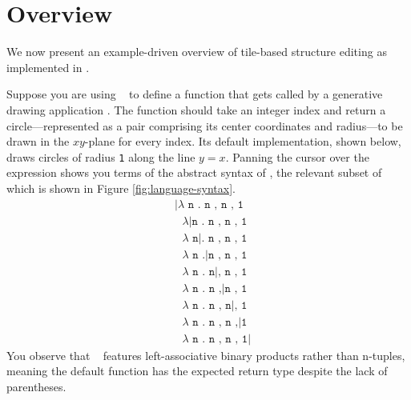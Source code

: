 \section{Overview}\label{sec:overview}






We now present an example-driven overview of tile-based
structure editing as implemented in \tylr.

Suppose you are using \tylr~ to define a function that gets called by a
generative drawing application .
The function should take an integer index and
return a circle---represented as a pair comprising
its center coordinates and radius---to be drawn in
the $xy$-plane for every index.
Its default implementation, shown below, draws circles
of radius \texttt{1} along the line $y = x$.
Panning the cursor over the expression shows you terms of
the abstract syntax of \tylr, the relevant subset of which
is shown in Figure \ref{fig:language-syntax}.
\begin{align*}
  & \texttt{|$\lambda$ n . n , n , 1} \\
  & \texttt{\ $\lambda$|n . n , n , 1} \\
  & \texttt{\ $\lambda$ n|. n , n , 1} \\
  & \texttt{\ $\lambda$ n .|n , n , 1} \\
  & \texttt{\ $\lambda$ n . n|, n , 1} \\
  & \texttt{\ $\lambda$ n . n ,|n , 1} \\
  & \texttt{\ $\lambda$ n . n , n|, 1} \\
  & \texttt{\ $\lambda$ n . n , n ,|1} \\
  & \texttt{\ $\lambda$ n . n , n , 1|}
\end{align*}
You observe that \tylr~ features left-associative binary
products rather than n-tuples, meaning the default function
has the expected return type despite the lack of parentheses.

